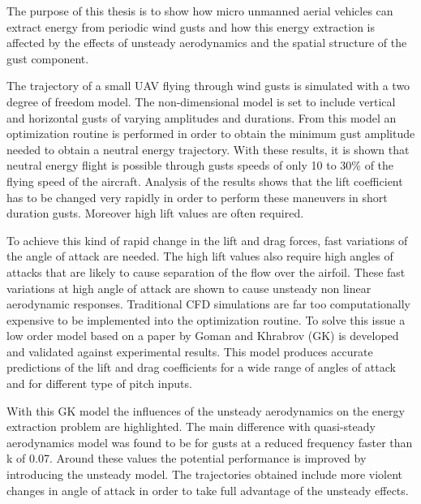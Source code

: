 \par The purpose of this thesis is to show how micro unmanned aerial vehicles can extract energy from periodic wind gusts and how this energy extraction is affected by the effects of unsteady aerodynamics and the spatial structure of the gust component.

\par The trajectory of a small UAV flying through wind gusts is simulated with a two degree of freedom model.
The non-dimensional model is set to include vertical and horizontal gusts of varying amplitudes and durations.
From this model an optimization routine is performed in order to obtain the minimum gust amplitude needed to obtain a neutral energy trajectory.
With these results, it is shown that neutral energy flight is possible through gusts speeds of only 10 to 30\% of the flying speed of the aircraft.
Analysis of the results shows that the lift coefficient has to be changed very rapidly in order to perform these maneuvers in short duration gusts. 
Moreover high lift values are often required. 

\par To achieve this kind of rapid change in the lift and drag forces, fast variations of the angle of attack are needed.
The high lift values also require high angles of attacks that are likely to cause separation of the flow over the airfoil.
These fast variations at high angle of attack are shown to cause unsteady non linear aerodynamic responses.
Traditional CFD simulations are far too computationally expensive to be implemented into the optimization routine.
To solve this issue a low order model based on a paper by Goman and Khrabrov \cite{GK} (GK) is developed and validated against experimental results.
This model produces accurate predictions of the lift and drag coefficients for a wide range of angles of attack and for different type of pitch inputs.

\par With this GK model the influences of the unsteady aerodynamics on the energy extraction problem are highlighted.
The main difference with quasi-steady aerodynamics model was found to be for gusts at a reduced frequency faster than k of 0.07.
Around these values the potential performance is improved by introducing the unsteady model.
The trajectories obtained include more violent changes in angle of attack in order to take full advantage of the unsteady effects.


